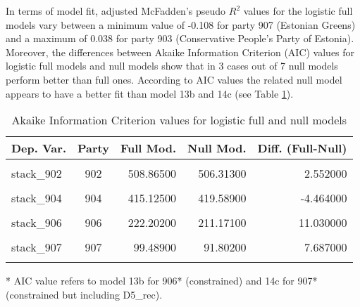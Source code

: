 \documentclass[
]{article}
\begin{document}
In terms of model fit, adjusted McFadden's pseudo \(R^2\) values for the logistic full models vary between
a minimum value of
-0.108
for party 907
(Estonian Greens)
and a maximum of
0.038
for party 903
(Conservative People's Party of Estonia).
Moreover, the differences between Akaike Information Criterion (AIC) values for logistic full models and
null models show that in 3 cases out of 7 null models perform better than full ones. According to AIC
values the related null model appears to have a better fit than model 13b and 14c (see Table
\ref{table:logit_aic_ee}).

\begin{table}[!h]

\caption{\label{tab:unnamed-chunk-57}Akaike Information Criterion values for logistic full and null models 
        \label{table:logit_aic_ee}}
\centering
\begin{threeparttable}
\begin{tabular}[t]{lcrrr}
\toprule
Dep. Var. & Party & Full Mod. & Null Mod. & Diff. (Full-Null)\\
\midrule
\cellcolor{gray!6}{stack\_901} & \cellcolor{gray!6}{901} & \cellcolor{gray!6}{694.22900} & \cellcolor{gray!6}{705.58000} & \cellcolor{gray!6}{-11.351000}\\
stack\_902 & 902 & 508.86500 & 506.31300 & 2.552000\\
\cellcolor{gray!6}{stack\_903} & \cellcolor{gray!6}{903} & \cellcolor{gray!6}{506.76400} & \cellcolor{gray!6}{528.63400} & \cellcolor{gray!6}{-21.871000}\\
stack\_904 & 904 & 415.12500 & 419.58900 & -4.464000\\
\cellcolor{gray!6}{stack\_905} & \cellcolor{gray!6}{905} & \cellcolor{gray!6}{652.00400} & \cellcolor{gray!6}{649.26800} & \cellcolor{gray!6}{2.736000}\\
\addlinespace
stack\_906 & 906 & 222.20200 & 211.17100 & 11.030000\\
\cellcolor{gray!6}{stack\_906*} & \cellcolor{gray!6}{906} & \cellcolor{gray!6}{222.96295} & \cellcolor{gray!6}{211.17148} & \cellcolor{gray!6}{11.791471}\\
stack\_907 & 907 & 99.48900 & 91.80200 & 7.687000\\
\cellcolor{gray!6}{stack\_907*} & \cellcolor{gray!6}{907} & \cellcolor{gray!6}{99.96929} & \cellcolor{gray!6}{91.80221} & \cellcolor{gray!6}{8.167081}\\
\bottomrule
\end{tabular}
\begin{tablenotes}[para]
\item[*] AIC value refers to model 13b for 906* (constrained) and 14c for 907* (constrained but including D5\_rec).
\end{tablenotes}
\end{threeparttable}
\end{table}
\end{document}
